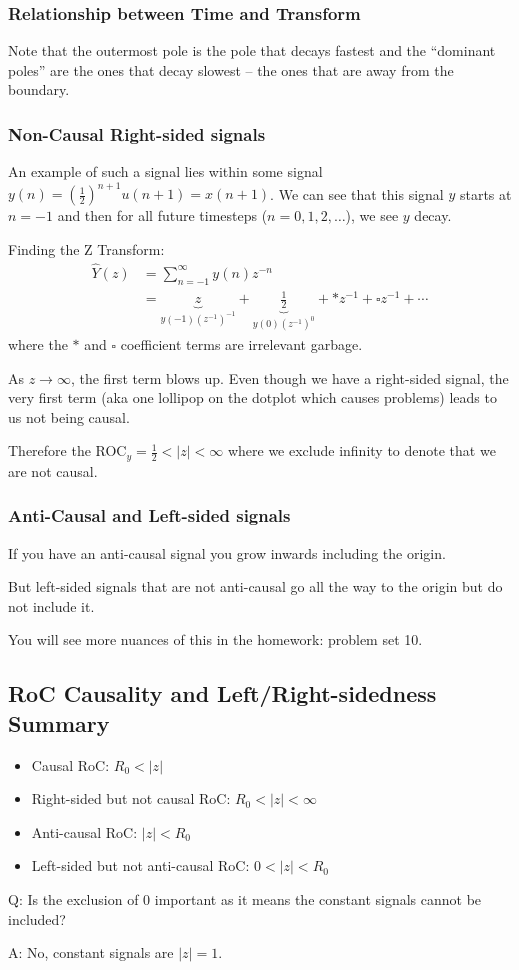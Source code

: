 \subsubsection{Relationship between Time and Transform}
Note that the outermost pole is the pole that decays fastest and the ``dominant poles'' are the ones that decay slowest -- the ones that are away from the boundary. 

\subsubsection{Non-Causal Right-sided signals}
An example of such a signal lies within some signal $y(n)=\left(\frac12\right)^{n+1} u(n+1)=x(n+1)$. We can see that this signal $y$ starts at $n=-1$ and then for all future timesteps ($n=0,1,2,\ldots$), we see $y$ decay.

Finding the Z Transform:
\begin{align*}
    \hat Y(z) 
    &= \sum_{n=-1}^\infty y(n) z^{-n} 
    \\
    &= \underbrace{z}_{y(-1)(z^{-1})^{-1}} + \underbrace{\frac12}_{y(0)(z^{-1})^{0}}
    + \ast z^{-1} + \square z^{-1} + \cdots
\end{align*}
where the $\ast$ and $\square$ coefficient terms are irrelevant garbage.

As $z\to\infty$, the first term blows up. Even though we have a right-sided signal, the very first term (aka one lollipop on the dotplot which causes problems) leads to us not being causal.

Therefore the ROC$_y = \frac12<|z|<\infty$ where we exclude infinity to denote that we are not causal.

\subsubsection{Anti-Causal and Left-sided signals}
If you have an anti-causal signal you grow inwards including the origin.

But left-sided signals that are not anti-causal go all the way to the origin but do not include it.

You will see more nuances of this in the homework: problem set 10.

\subsection{ RoC Causality and Left/Right-sidedness Summary}
\begin{itemize}
    \item Causal RoC: $R_0<|z|$
    \item Right-sided but not causal RoC: $R_0<|z|<\infty$
    \item Anti-causal RoC: $|z|<R_0$
    \item Left-sided but not anti-causal RoC: $0<|z|<R_0$
\end{itemize}
\begin{shaded}
Q: Is the exclusion of 0 important as it means the constant signals cannot be included?
\end{shaded}
A: No, constant signals are $|z|=1$.

